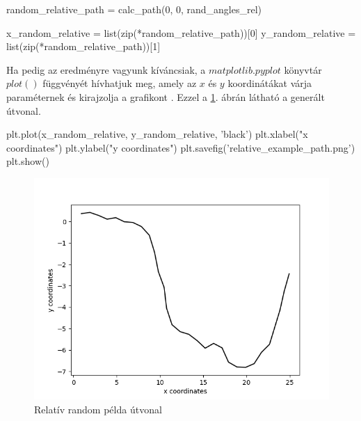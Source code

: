 \begin{python}
random_relative_path = calc_path(0, 0, rand_angles_rel)

x_random_relative = list(zip(*random_relative_path))[0]
y_random_relative = list(zip(*random_relative_path))[1]
\end{python}
Ha pedig az eredményre vagyunk kíváncsiak, a $ matplotlib.pyplot $ könyvtár  $ plot() $ függvényét hívhatjuk meg, amely az $ x $ és $ y $ koordinátákat várja paraméternek és kirajzolja a grafikont \cite{Matplotlib}. Ezzel a \ref{fig:relative_path}. ábrán látható a generált útvonal.
\begin{python}
plt.plot(x_random_relative, y_random_relative, 'black')
plt.xlabel("x coordinates")
plt.ylabel("y coordinates")
plt.savefig('relative_example_path.png')
plt.show()
\end{python}

\begin{figure}[h!]
\centering
\includegraphics[scale=0.75]{images/relative_example_path.png}
\caption{Relatív random példa útvonal}
\label{fig:relative_path}
\end{figure}

\newpage


